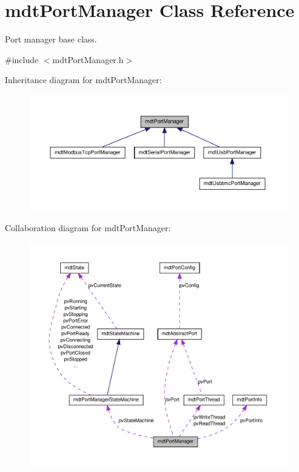 \hypertarget{classmdt_port_manager}{
\section{mdtPortManager Class Reference}
\label{classmdt_port_manager}
}


Port manager base class.  




{\ttfamily \#include $<$mdtPortManager.h$>$}



Inheritance diagram for mdtPortManager:\nopagebreak
\begin{figure}[H]
\begin{center}
\leavevmode
\includegraphics[width=400pt]{classmdt_port_manager__inherit__graph}
\end{center}
\end{figure}


Collaboration diagram for mdtPortManager:
\nopagebreak
\begin{figure}[H]
\begin{center}
\leavevmode
\includegraphics[width=400pt]{classmdt_port_manager__coll__graph}
\end{center}
\end{figure}
